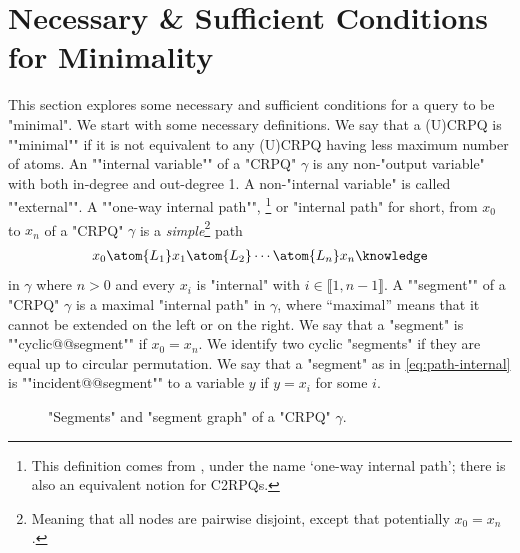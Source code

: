 \section{Necessary \& Sufficient Conditions for Minimality}

This section explores some necessary and sufficient conditions for a query to be "minimal".
We start with some necessary definitions.
\AP
We say that a (U)CRPQ is \AP""minimal"" if it is not equivalent to any (U)CRPQ having less maximum number of atoms.
An ""internal variable"" of a "CRPQ" $\gamma$ is any non-"output variable" with both in-degree and out-degree 1.
A non-"internal variable" is called \AP""external"".
A \AP""one-way internal path"",%
\footnote{This definition comes from \cite[\S 7]{FigueiraMorvan2025SemanticTreeWidthLMCS}, 
under the name `one-way internal path'; there is also an equivalent
notion for C2RPQs.}
or "internal path" for short, from $x_0$ to $x_n$ of a "CRPQ" $\gamma$ is a \emph{simple}\footnote{Meaning that all nodes are pairwise disjoint,
except that potentially $x_0 = x_n$.} path
\begin{align}
	x_0 \atom{L_1} x_1 \atom{L_2} \cdots \atom{L_n} x_n 
	\AP\label{eq:path-internal}
\end{align}
in $\gamma$ where $n > 0$ and every $x_i$ is "internal" with $i \in \lBrack 1,n-1\rBrack$.
A \AP""segment"" of a "CRPQ" $\gamma$ is a maximal "internal 
path" in $\gamma$, where ``maximal'' means that it cannot be extended on the left
or on the right. We say that a "segment" is \AP""cyclic@@segment"" if $x_0 = x_n$.
We identify two cyclic "segments" if they are equal up to circular permutation.
We say that a "segment" as in \eqref{eq:path-internal} is \AP""incident@@segment""
to a variable $y$ if $y = x_i$ for some $i$.

\begin{figure}
	\centering
	\hfill%
	\caption{"Segments" and "segment graph" of a "CRPQ" $\gamma$.}
\end{figure}


